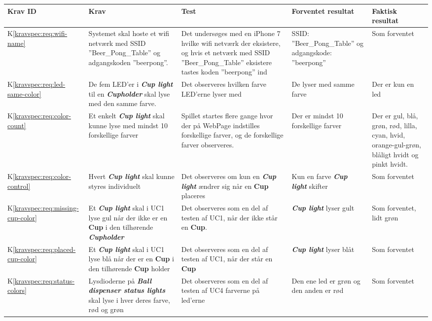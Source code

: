 \documentclass[Accepttestspecifikation/Accepttest_Main.tex]{subfiles}
\begin{document}
\begin{longtable}{|L{0.08\textwidth}|L{0.3\textwidth}|L{0.3\textwidth}|L{0.2\textwidth}|L{0.2\textwidth}|}
\hline
\textbf{Krav ID} & \textbf{Krav} & \textbf{Test} & \textbf{Forventet resultat} & \textbf{Faktisk resultat} \\ \hline

K\ref{kravspec:req:wifi-name}& Systemet skal hoste et wifi netværk med SSID ''Beer\_Pong\_Table'' og adgangskoden ''beerpong''. & Det undersøges med en  iPhone 7 hvilke wifi netværk der eksistere, og hvis et netværk med SSID ''Beer\_Pong\_Table'' eksistere tastes koden ''beerpong'' ind & SSID: ''Beer\_Pong\_Table'' og adgangskode: ''beerpong'' & Som forventet \\ \hline
K\ref{kravspec:req:led-same-color} & De fem LED'er i \textit{\textbf{Cup light}} til en \textit{\textbf{Cupholder}} skal lyse med den samme farve. & Det observeres hvilken farve LED'erne lyser med & De lyser med samme farve & Der er kun en led\\ \hline
K\ref{kravspec:req:color-count} & Et enkelt \textit{\textbf{Cup light}} skal kunne lyse med mindst 10 forskellige farver & Spillet startes flere gange hvor der på WebPage indstilles forskellige farver, og de forskellige farver observeres. & Der er mindst 10 forskellige farver & Der er gul, blå, grøn, rød, lilla, cyan, hvid, orange-gul-grøn, blåligt hvidt og pinkt hvidt.\\ \hline
K\ref{kravspec:req:color-control} & Hvert \textit{\textbf{Cup light}} skal kunne styres individuelt & Det observeres om kun en \textit{\textbf{Cup light}} ændrer sig når en \textbf{Cup} placeres & Kun en farve \textbf{\textit{Cup light}} skifter & Som forventet\\ \hline 
K\ref{kravspec:req:missing-cup-color} & Et \textit{\textbf{Cup light}} skal i UC1 lyse gul når der ikke er en \textbf{Cup} i den tilhørende \textit{\textbf{Cupholder}}  & Det observeres som en del af testen af UC1, når der ikke står en \textbf{Cup}.& \textbf{\textit{Cup light}} lyser gult & Som forventet, lidt grøn\\ \hline
K\ref{kravspec:req:placed-cup-color} & Et \textit{\textbf{Cup light}} skal i UC1 lyse blå når der er en \textbf{Cup} i den tilhørende \textbf{Cup} holder & Det observeres som en del af testen af UC1, når der står en \textbf{Cup} & \textbf{\textit{Cup light}} lyser blåt & Som forventet \\ \hline
K\ref{kravspec:req:status-colors} & Lysdioderne på \textit{\textbf{Ball dispenser status lights}} skal lyse i hver deres farve, rød og grøn & Det observeres som en del af testen af UC4 farverne på led'erne & Den ene led er grøn og den anden er rød & Som forventet \\ \hline

\end{longtable}
\end{document}
